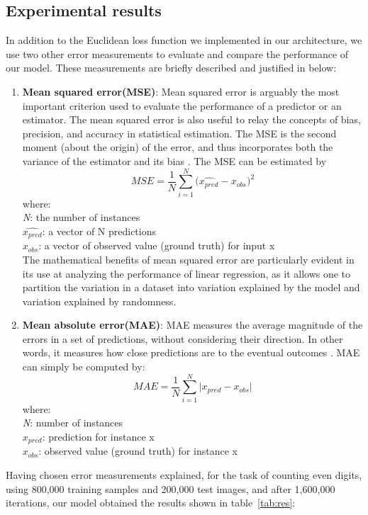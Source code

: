 \subsection{Experimental results}

In addition to the Euclidean loss function we implemented in our architecture, we use two other error measurements to evaluate and compare the performance of our model. These measurements are briefly described and justified in below:
\begin{enumerate}
\item \textbf{Mean squared error(MSE)}: Mean squared error is arguably the most important criterion used to evaluate the performance of a predictor or an estimator. The mean squared error is also useful to relay the concepts of bias, precision, and accuracy in statistical estimation. The MSE is the second moment (about the origin) of the error, and thus incorporates both the variance of the estimator and its bias \cite{lehmann1998theory}. The MSE can be estimated by
$$MSE = {\frac{1} {N}{\sum\limits_{i = 1}^N {(\hat{x_{pred}} - x_{obs} } })^{2} } $$
where:\\
\textit{N}: the number of instances\\
\textit{ $\hat{x_{pred}}$}: a vector of N predictions\\
\textit{$x_{obs}$}: a vector of observed value (ground truth) for input x\\

The mathematical benefits of mean squared error are particularly evident in its use at analyzing the performance of linear regression, as it allows one to partition the variation in a dataset into variation explained by the model and variation explained by randomness.
\item \textbf{Mean absolute error(MAE)}: MAE measures the average magnitude of the errors in a set of predictions, without considering their direction. In other words, it measures how close predictions are to the eventual outcomes \cite{willmott2005advantages}. MAE can simply be computed by:
$$MAE = {\frac{1} {N}{\sum\limits_{i = 1}^N {|x_{pred} - x_{obs} } }| } $$
where:\\
\textit{N}: number of instances\\
\textit{ $x_{pred}$}: prediction for instance x\\
\textit{$x_{obs}$}: observed value (ground truth) for instance x
\end{enumerate}

\noindent Having chosen error measurements explained, for the task of counting even digits, using 800,000 training samples and 200,000 test images, and after 1,600,000 iterations, our model obtained the results shown in table~\ref{tab:res}:


